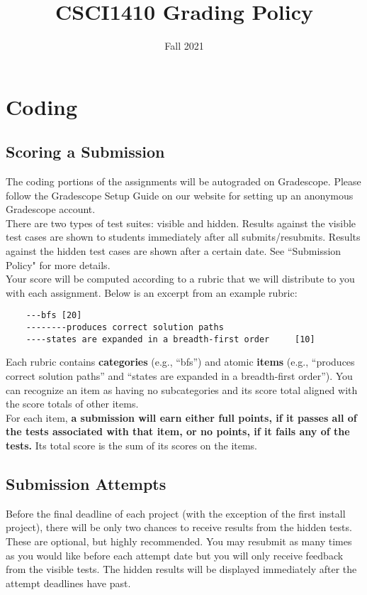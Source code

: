 \documentclass{article}
\title{CSCI1410 Grading Policy}
\author{}
\date{Fall 2021}
\begin{document}
\maketitle

\section{Coding}
\subsection{Scoring a Submission}
The coding portions of the assignments will be autograded on Gradescope. Please follow the Gradescope Setup Guide on our website for setting up an anonymous Gradescope account. \\

There are two types of test suites: visible and hidden. Results against the visible test cases are shown to students immediately after all submits/resubmits. Results against the hidden test cases are shown after a certain date. See ``Submission Policy" for more details. \\

Your score will be computed according to a rubric that we will distribute to you with each assignment.
Below is an excerpt from an example rubric:

\begin{verbatim}
    ---bfs [20]
    --------produces correct solution paths
    ----states are expanded in a breadth-first order     [10]
\end{verbatim}

Each rubric contains \textbf{categories} (e.g., ``bfs'') and atomic \textbf{items} (e.g., ``produces correct solution paths'' and ``states are expanded in a breadth-first order'').
You can recognize an item as having no subcategories and its score total aligned with the score totals of other items. ~\\

For each item, \textbf{a submission will earn either full points, if it passes all of the tests associated with that item, or no points, if it fails any of the tests.}
Its total score is the sum of its scores on the items. 

\subsection{Submission Attempts}

Before the final deadline of each project (with the exception of the first install project), there will be only two chances to receive results from the hidden tests. These are optional, but highly recommended. You may resubmit as many times as you would like before each attempt date but you will only receive feedback from the visible tests. The hidden results will be displayed immediately after the attempt deadlines have past.  
\end{document}
